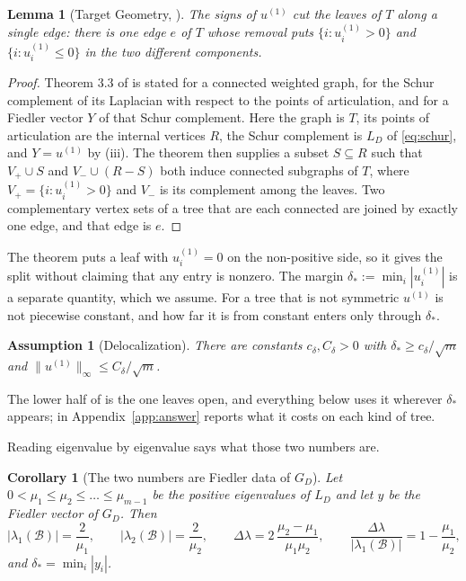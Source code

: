 \documentclass[11pt]{article}
\newtheorem{lemma}{Lemma}
\newtheorem{assumption}{Assumption}
\newtheorem{corollary}{Corollary}
\begin{document}
\begin{lemma}[Target Geometry, {\cite[Theorem 3.3]{stone2009fiedler}}]
\label{lem:target}
The signs of $u^{(1)}$ cut the leaves of $T$ along a single edge: there is one edge $e$ of
$T$ whose removal puts $\{i : u^{(1)}_i > 0\}$ and $\{i : u^{(1)}_i \le 0\}$ in the two
different components.
\end{lemma}

\begin{proof}
Theorem 3.3 of \cite{stone2009fiedler} is stated for a connected weighted graph, for the
Schur complement of its Laplacian with respect to the points of articulation, and for a
Fiedler vector $Y$ of that Schur complement. Here the graph is $T$, its points of
articulation are the internal vertices $R$, the Schur complement is $L_D$ of
\eqref{eq:schur}, and $Y = u^{(1)}$ by (iii). The theorem then
supplies a subset $S \subseteq R$ such that $V_+ \cup S$ and $V_- \cup (R-S)$ both induce
connected subgraphs of $T$, where $V_+ = \{i : u^{(1)}_i > 0\}$ and $V_-$ is its
complement among the leaves. Two complementary vertex sets of a tree that are each
connected are joined by exactly one edge, and that edge is $e$.
\end{proof}

The theorem puts a leaf with $u^{(1)}_i = 0$ on the non-positive side, so it gives the
split without claiming that any entry is nonzero. The margin
$\delta_* := \min_i |u^{(1)}_i|$ is a separate quantity, which we assume. For a tree that
is not symmetric $u^{(1)}$ is not piecewise constant, and how far it is from constant
enters only through $\delta_*$.

\begin{assumption}[Delocalization]
\label{as:deloc}
There are constants $c_\delta, C_\delta > 0$ with
$\delta_* \ge c_\delta / \sqrt{m}$ and $\|u^{(1)}\|_\infty \le C_\delta / \sqrt{m}$.
\end{assumption}
The lower half of  is the one  leaves open, and everything
below uses it wherever $\delta_*$ appears;  in Appendix~\ref{app:answer}
reports what it costs on each kind of tree.

Reading  eigenvalue by eigenvalue says what those two numbers
are.

\begin{corollary}[The two numbers are Fiedler data of $G_D$]
\label{cor:two-numbers}
Let $0 < \mu_1 \le \mu_2 \le \dots \le \mu_{m-1}$ be the positive eigenvalues of $L_D$ and
let $y$ be the Fiedler vector of $G_D$. Then
\begin{equation}
\label{eq:transfer}
|\lambda_1(\mathcal{B})| = \frac{2}{\mu_1}, \qquad
|\lambda_2(\mathcal{B})| = \frac{2}{\mu_2}, \qquad
\Delta\lambda = 2\,\frac{\mu_2 - \mu_1}{\mu_1 \mu_2}, \qquad
\frac{\Delta\lambda}{|\lambda_1(\mathcal{B})|} = 1 - \frac{\mu_1}{\mu_2},
\end{equation}
and $\delta_* = \min_i |y_i|$.
\end{corollary}
\end{document}
